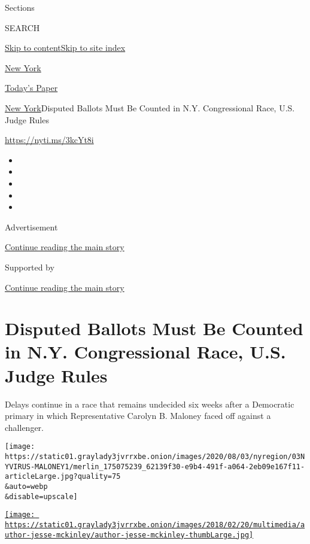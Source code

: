 Sections

SEARCH

\protect\hyperlink{site-content}{Skip to
content}\protect\hyperlink{site-index}{Skip to site index}

\href{https://www.nytimes3xbfgragh.onion/section/nyregion}{New York}

\href{https://myaccount.nytimes3xbfgragh.onion/auth/login?response_type=cookie\&client_id=vi}{}

\href{https://www.nytimes3xbfgragh.onion/section/todayspaper}{Today's
Paper}

\href{/section/nyregion}{New York}\textbar{}Disputed Ballots Must Be
Counted in N.Y. Congressional Race, U.S. Judge Rules

\url{https://nyti.ms/3kcYt8i}

\begin{itemize}
\item
\item
\item
\item
\item
\end{itemize}

Advertisement

\protect\hyperlink{after-top}{Continue reading the main story}

Supported by

\protect\hyperlink{after-sponsor}{Continue reading the main story}

\hypertarget{disputed-ballots-must-be-counted-in-ny-congressional-race-us-judge-rules}{%
\section{Disputed Ballots Must Be Counted in N.Y. Congressional Race,
U.S. Judge
Rules}\label{disputed-ballots-must-be-counted-in-ny-congressional-race-us-judge-rules}}

Delays continue in a race that remains undecided six weeks after a
Democratic primary in which Representative Carolyn B. Maloney faced off
against a challenger.

\texttt{[image: https://static01.graylady3jvrrxbe.onion/images/2020/08/03/nyregion/03NYVIRUS-MALONEY1/merlin\_175075239\_62139f30-e9b4-491f-a064-2eb09e167f11-articleLarge.jpg?quality=75\\\&auto=webp\\\&disable=upscale]}

\href{https://www.nytimes3xbfgragh.onion/by/jesse-mckinley}{\texttt{[image: https://static01.graylady3jvrrxbe.onion/images/2018/02/20/multimedia/author-jesse-mckinley/author-jesse-mckinley-thumbLarge.jpg]}}

